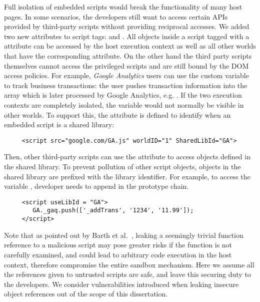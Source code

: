  Full isolation of embedded scripts would break the functionality of many host pages.  In some scenarios, the developers still want to access certain APIs provided by third-party scripts without providing reciprocal accesses.  We added two new attributes to script tags:  and .  All objects inside a script tagged with a  attribute can be accessed by the host execution context as well as all other worlds that have the corresponding  attribute.  On the other hand the third party scripts themselves cannot access the privileged scripts and are still bound by the DOM access policies.  For example, \emph{Google Analytics} users can use the custom variable  to track business transactions: the user pushes transaction information into the array  which is later processed by Google Analytics, e.g. .  If the two execution contexts are completely isolated, the  variable would not normally be visible in other worlds.  To support this, the  attribute is defined to identify when an embedded script is a shared library:

\lstset{xleftmargin=.1\textwidth,xrightmargin=.1\textwidth}
\begin{lstlisting}
     <script src="google.com/GA.js" worldID="1" SharedLibId="GA">
\end{lstlisting}
Then, other third-party scripts can use the  attribute to access objects defined in the shared library.  To prevent pollution of other script objects, objects in the shared library are prefixed with the library identifier.  For example, to access the variable , developer needs to append  in the prototype chain.

\begin{lstlisting}
     <script useLibId = "GA">
        GA._gaq.push(['_addTrans', '1234', '11.99']);
     </script>
\end{lstlisting}

Note that as pointed out by Barth et al.~\cite{Finifter_preventingcapability,COL}, leaking a seemingly trivial function reference to a malicious script may pose greater risks if the function is not carefully examined, and could lead to arbitrary code execution in the host context, therefore compromise the entire sandbox mechanism.  Here we assume all the references given to untrusted scripts are safe, and leave this securing duty to the developers.  We consider vulnerabilities introduced when leaking insecure object references out of the scope of this dissertation.

